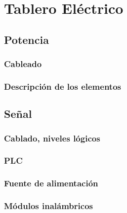 \chapter{Tablero Eléctrico}
\label{ch:tablero}

\section{Potencia}
\label{sec:Potencia}
\subsection{Cableado}
\subsection{Descripción de los elementos}

\section{Señal}
\label{sec:Senal}

\subsection{Cablado, niveles lógicos}
\subsection{PLC}
\subsection{Fuente de alimentación}
\subsection{Módulos inalámbricos}